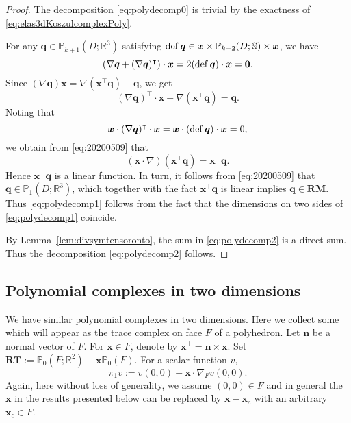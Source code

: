 \begin{proof}
The decomposition \eqref{eq:polydecomp0} is trivial by the exactness of \eqref{eq:elas3dKoszulcomplexPoly}. 

For any $\boldsymbol q\in\mathbb P_{k+1}(D;\mathbb R^3)$ satisfying $\operatorname{def}\boldsymbol q\in\boldsymbol x\times\mathbb P_{k-2}(D;\mathbb S)\times \boldsymbol  x$, we have
\[
(\nabla\boldsymbol q+(\nabla\boldsymbol q)^{\intercal})\cdot \boldsymbol x=2(\operatorname{def}\boldsymbol q)\cdot\boldsymbol x=\boldsymbol 0.
\]
Since $(\nabla\boldsymbol q)\boldsymbol x=\nabla(\boldsymbol x^{\intercal}\boldsymbol q)-\boldsymbol q$, we get
\begin{equation}\label{eq:20200509}
(\nabla\boldsymbol q)^{\intercal}\cdot\boldsymbol  x + \nabla(\boldsymbol x^{\intercal}\boldsymbol q)=\boldsymbol q.
\end{equation}
Noting that
\[
\boldsymbol x\cdot(\nabla\boldsymbol q)^{\intercal}\cdot\boldsymbol  x=\boldsymbol x\cdot(\operatorname{def}\boldsymbol q)\cdot\boldsymbol  x=0,
\]
we obtain from \eqref{eq:20200509} that
\[
(\boldsymbol x\cdot\nabla)(\boldsymbol x^{\intercal}\boldsymbol q)=\boldsymbol x^{\intercal}\boldsymbol q.
\]
Hence $\boldsymbol x^{\intercal}\boldsymbol q$ is a linear function. In turn, it follows from \eqref{eq:20200509} that $\boldsymbol q\in\mathbb P_{1}(D;\mathbb R^3)$, which together with the fact $\boldsymbol x^{\intercal}\boldsymbol q$ is linear implies $\boldsymbol q\in\boldsymbol{RM}$. Thus \eqref{eq:polydecomp1} follows from the fact that the dimensions on two sides of \eqref{eq:polydecomp1} coincide.

By Lemma~\ref{lem:divsymtensoronto}, the sum in \eqref{eq:polydecomp2} is a direct sum. Thus the decomposition \eqref{eq:polydecomp2} follows.
\end{proof}

\subsection{Polynomial complexes in two dimensions}
We have similar polynomial complexes in two dimensions. Here we collect some which will appear as the trace complex on face $F$ of a polyhedron. Let $\boldsymbol  n$ be a normal vector of $F$. For $\boldsymbol  x\in F$, denote by $\boldsymbol  x^{\bot} = \boldsymbol  n\times \boldsymbol  x$. 
Set $\boldsymbol{RT}:=\mathbb P_0(F;\mathbb R^2)+\boldsymbol  x\mathbb P_0(F)$.
For a scalar function $v$,
$$
\pi_1v:=v(0,0)+\boldsymbol  x\cdot\nabla_Fv(0,0).
$$
Again, here without loss of generality, we assume $(0,0)\in F$ and in general the $\boldsymbol  x$ in the results presented below can be replaced by $\boldsymbol  x - \boldsymbol  x_c$ with an arbitrary $\boldsymbol  x_c\in F$.  

